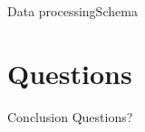 \documentclass{beamer}
\begin{document}
\begin{frame}{Data processing}{Schema}
    \begin{center}
    \end{center}
\end{frame}

\section{Questions}

\begin{frame}{Conclusion}
    \huge{Questions?}
\end{frame}
\end{document}
